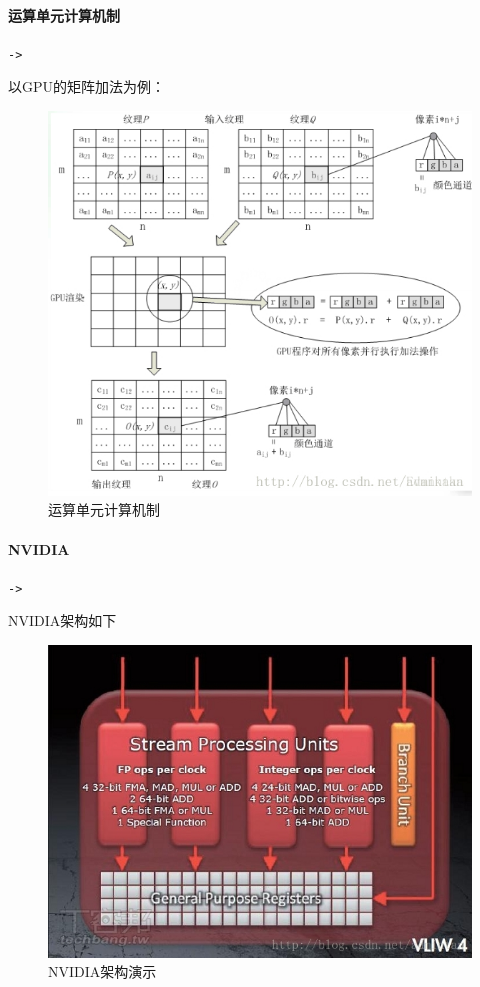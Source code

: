 \documentclass[UTF8,a4paper,12pt]{ctexbook}
\begin{document}
			\paragraph{运算单元计算机制}\verb|->|
				
				以GPU的矩阵加法为例：
				\begin{figure}[H]
					\centering
					\includegraphics[scale=0.84]{comU}
					\caption{运算单元计算机制}
				\end{figure}

			
			\paragraph{NVIDIA}\verb|->|
			
				NVIDIA架构如下
				\begin{figure}[H]
					\centering
					\includegraphics[scale=0.5]{NVIDIA}
					\caption{NVIDIA架构演示}
				\end{figure}
				
\end{document}
